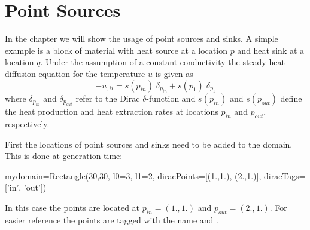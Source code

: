 
%
%
%

\section{Point Sources}
\label{POINT SOURCES}
In the chapter we will show the usage of point sources and sinks. 
A simple example is a block of material with heat source at a location
$p$ and heat sink at a location $q$. Under the assumption of a constant
conductivity the steady heat diffusion equation for the temperature $u$
is given as 
\begin{equation}
        -u_{,ii} = s(p_{in}) \; \delta_{p_{in}} + s(p_1) \; \delta_{p_1}
        \label{EX:DIRAC1}
\end{equation}
where $\delta_{p_{in}}$ and $\delta_{p_{out}}$ refer to the Dirac $\delta$-function and
$s({p_{in}})$ and $s({p_{out}})$ define the heat production and heat extraction rates at 
locations ${p_{in}}$ and ${p_{out}}$, respectively.

First the locations of  point sources and sinks need to be added to the 
domain. This is done at generation time:  
\begin{python}
mydomain=Rectangle(30,30, l0=3, l1=2, 
                diracPoints=[(1.,1.), (2.,1.)],  diracTags=['in', 'out'])
\end{python}
In this case the points are located at $p_{in}=(1.,1.)$ and $p_{out}=(2.,1.)$.
For easier reference the points are tagged with the name  and . 

